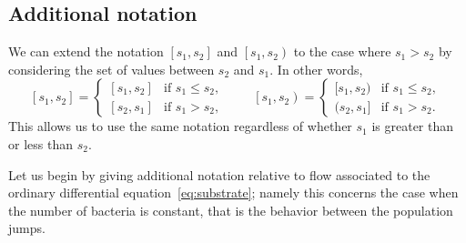 \documentclass[10pt]{amsart}
\theoremstyle{definition}\newtheorem{defi}[theo]{Definition}\newtheorem{rema}[theo]{Remark}\newtheorem{exam}[theo]{Example}\newtheorem{exem}[theo]{Example}\newtheorem{nota}[theo]{Notation}
\newcommand{\ens}[2]{\left[#1,#2\right]}
\newcommand{\ensco}[2]{\left[#1,#2\right)}
\newcommand{\1}{\mathbf{1}}
\begin{document}
\subsection{Additional notation}\label{sec.add.notations}


We can extend the notation $\ens{s_1}{s_2}$ and $\ensco{s_1}{s_2}$ to the case where $s_1 > s_2$ by considering the set of values between $s_2$ and $s_1$. In other words,
\[
\ens{s_1}{s_2}=
\begin{cases}
[s_1,s_2] & \text{if }s_1\leq s_2,\\
[s_2,s_1] & \text{if }s_1>s_2,
\end{cases}\,
\qquad
\ensco{s_1}{s_2}=
\begin{cases}
[s_1,s_2) & \text{if }s_1\leq s_2,\\
(s_2,s_1] & \text{if }s_1>s_2.
\end{cases}\,
\]
This allows us to use the same notation regardless of whether $s_1$ is greater than or less than $s_2$.



Let us begin by giving additional notation relative to flow associated to the ordinary differential equation~\eqref{eq:substrate}; namely this concerns the case when the number of bacteria is constant, that is the behavior between the population jumps.
\end{document}
